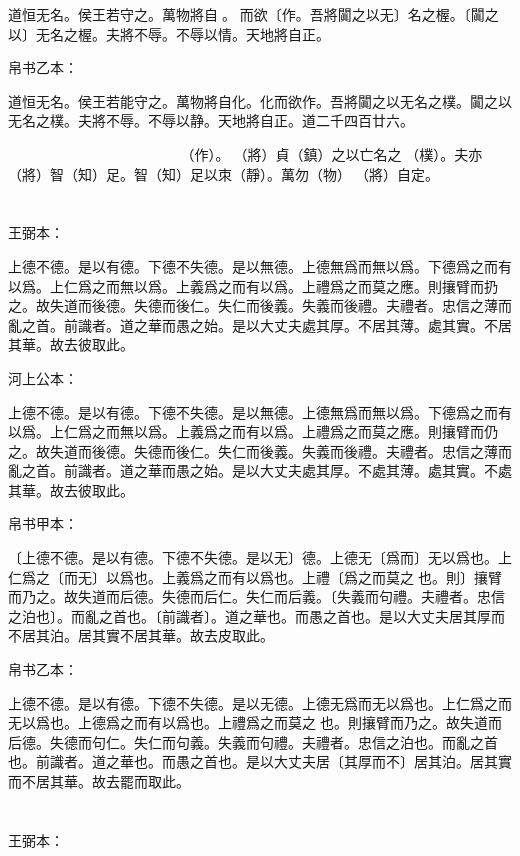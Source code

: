 \documentclass[a5paper]{ctexbook}
\begin{document}
    道恒无名。侯王若守之。萬物將自𢡺。𢡺而欲〔作。吾將闐之以无〕名之楃。〔闐之以〕无名之楃。夫將不辱。不辱以情。天地將自正。

    帛书乙本：

    道恒无名。侯王若能守之。萬物將自化。化而欲作。吾將闐之以无名之樸。闐之以无名之樸。夫將不辱。不辱以静。天地將自正。道二千四百廿六。

    𧗟（道）𠄨（恒）亡爲也。侯王能守之。而萬勿（物）𨟻（將）自𢠿（化）。𢠿（化）而𨿜（欲）󶴮（作）。𨟻（將）貞（鎮）之以亡名之󶴯（樸）。夫亦𨟻（將）智（知）足。智（知）足以朿（靜）。萬勿（物）𨟻（將）自定。

    \chapter{}
    王弼本：

    上德不德。是以有德。下德不失德。是以無德。上德無爲而無以爲。下德爲之而有以爲。上仁爲之而無以爲。上義爲之而有以爲。上禮爲之而莫之應。則攘臂而扔之。故失道而後德。失德而後仁。失仁而後義。失義而後禮。夫禮者。忠信之薄而亂之首。前識者。道之華而愚之始。是以大丈夫處其厚。不居其薄。處其實。不居其華。故去彼取此。

    河上公本：

    上德不德。是以有德。下德不失德。是以無德。上德無爲而無以爲。下德爲之而有以爲。上仁爲之而無以爲。上義爲之而有以爲。上禮爲之而莫之應。則攘臂而仍之。故失道而後德。失德而後仁。失仁而後義。失義而後禮。夫禮者。忠信之薄而亂之首。前識者。道之華而愚之始。是以大丈夫處其厚。不處其薄。處其實。不處其華。故去彼取此。

    帛书甲本：

    〔上德不德。是以有德。下德不失德。是以无〕德。上德无〔爲而〕无以爲也。上仁爲之〔而无〕以爲也。上義爲之而有以爲也。上禮〔爲之而莫之𤻮也。則〕攘臂而乃之。故失道而后德。失德而后仁。失仁而后義。〔失義而句禮。夫禮者。忠信之泊也〕。而亂之首也。〔前識者〕。道之華也。而愚之首也。是以大丈夫居其厚而不居其泊。居其實不居其華。故去皮取此。

    帛书乙本：

    上德不德。是以有德。下德不失德。是以无德。上德无爲而无以爲也。上仁爲之而无以爲也。上德爲之而有以爲也。上禮爲之而莫之𤻮也。則攘臂而乃之。故失道而后德。失德而句仁。失仁而句義。失義而句禮。夫禮者。忠信之泊也。而亂之首也。前識者。道之華也。而愚之首也。是以大丈夫居〔其厚而不〕居其泊。居其實而不居其華。故去罷而取此。

    \chapter{}
    王弼本：
\end{document}
